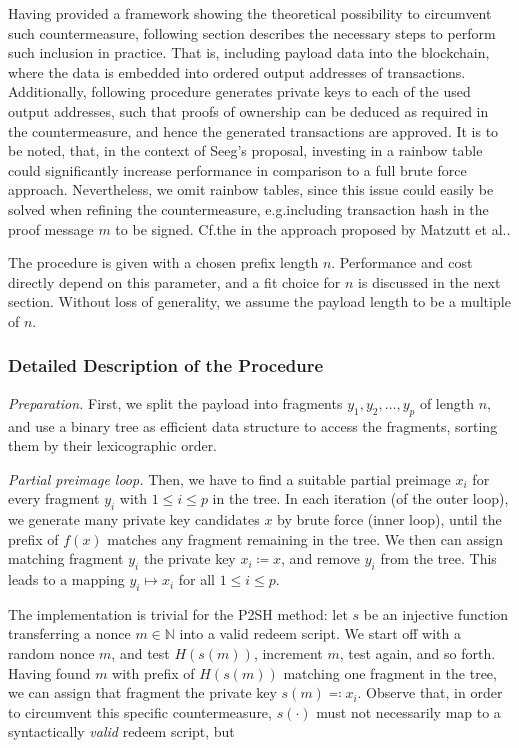\documentclass[a4paper,11pt,titlepage]{scrbook}
\begin{document}
Having provided a framework showing the theoretical possibility to circumvent such countermeasure, following section describes the necessary steps to perform such inclusion in practice.
That is, including payload data into the blockchain, where the data is embedded into ordered output addresses of transactions.
Additionally, following procedure generates private keys to each of the used output addresses, such that proofs of ownership can be deduced as required in the countermeasure, and hence the generated transactions are approved.
It is to be noted, that, in the context of Seeg's proposal, investing in a rainbow table could significantly increase performance in comparison to a full brute force approach.
Nevertheless, we omit rainbow tables, since this issue could easily be solved when refining the countermeasure, e.g.\@ including transaction hash in the proof message $m$ to be signed.
Cf.\@ the  in the approach proposed by Matzutt et al.\@ \cite[368--369]{matzutt_thwarting_2018}.

The procedure is given with a chosen prefix length $n$. Performance and cost directly depend on this parameter, and a fit choice for $n$ is discussed in the next section.
Without loss of generality, we assume the payload length to be a multiple of $n$.

\subsubsection*{Detailed Description of the Procedure}

\emph{Preparation.} First, we split the payload into fragments $y_1, y_2, \dots, y_p$ of length $n$, and use a binary tree as efficient data structure to access the fragments, sorting them by their lexicographic order.

\emph{Partial preimage loop.}
Then, we have to find a suitable partial preimage $x_i$ for every fragment $y_i$ with $1\leq i \leq p$ in the tree.
In each iteration (of the outer loop), we generate many private key candidates $x$ by brute force (inner loop), until the prefix of $f(x)$ matches any fragment remaining in the tree.
We then can assign matching fragment $y_i$ the private key $x_i \coloneqq x$, and remove $y_i$ from the tree.
This leads to a mapping $y_i \mapsto x_i$ for all $1\leq i\leq p$.

The implementation is trivial for the P2SH method: let $s$ be an injective function transferring a nonce $m\in\mathbb{N}$ into a valid redeem script.
We start off with a random nonce $m$, and test $H(s(m))$, increment $m$, test again, and so forth.
Having found $m$ with prefix of $H(s(m))$ matching one fragment in the tree, we can assign that fragment the private key $s(m)\eqqcolon x_i$.
Observe that, in order to circumvent this specific countermeasure, $s(\cdot)$ must not necessarily map to a syntactically \emph{valid} redeem script, but %
\end{document}
